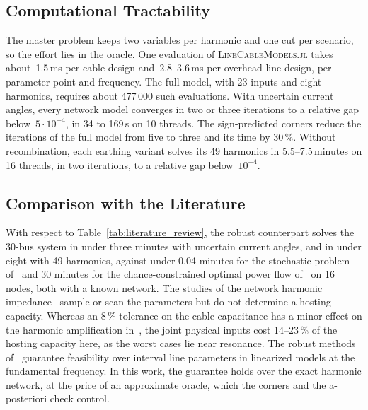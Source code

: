 \subsection{Computational Tractability}
\label{sec:tractability}

The master problem keeps two variables per harmonic and one cut per scenario, so the effort lies in the oracle. One evaluation of \textsc{LineCableModels.jl} takes about~1.5\,ms per cable design and~2.8--3.6\,ms per overhead-line design, per parameter point and frequency. The full model, with 23 inputs and eight harmonics, requires about 477\,000 such evaluations. With uncertain current angles, every network model converges in two or three iterations to a relative gap below~$5\cdot10^{-4}$, in 34 to 169\,s on 10 threads. The sign-predicted corners reduce the iterations of the full model from five to three and its time by 30\,\%. Without recombination, each earthing variant solves its 49 harmonics in 5.5--7.5\,minutes on 16 threads, in two iterations, to a relative gap below~$10^{-4}$.

\subsection{Comparison with the Literature}
\label{sec:literature_comparison}

With respect to Table~\ref{tab:literature_review}, the robust counterpart solves the 30-bus system in under three minutes with uncertain current angles, and in under eight with 49 harmonics, against under 0.04 minutes for the stochastic problem of~\cite{vanacker_shhc} and 30 minutes for the chance-constrained optimal power flow of~\cite{sun_distribution_2022} on 16 nodes, both with a known network. The studies of the network harmonic impedance~\cite{testa_probabilistic_2002,li_probabilistic_2018,li2020,barakou_parameter_2023} sample or scan the parameters but do not determine a hosting capacity. Whereas an 8\,\% tolerance on the cable capacitance has a minor effect on the harmonic amplification in~\cite{barakou_parameter_2023}, the joint physical inputs cost 14--23\,\% of the hosting capacity here, as the worst cases lie near resonance. The robust methods of~\cite{christakou_voltage_2018,liu_feasible_2023} guarantee feasibility over interval line parameters in linearized models at the fundamental frequency. In this work, the guarantee holds over the exact harmonic network, at the price of an approximate oracle, which the corners and the a-posteriori check control.